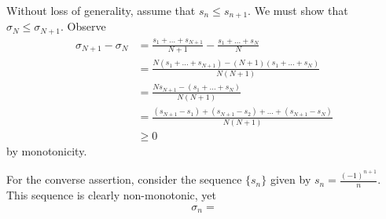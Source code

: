 \documentclass{homework}
\begin{document}

\begin{solution}
  Without loss of generality, assume that $s_n\le s_{n+1}$. We must show that $\sigma_N \le \sigma_{N+1}$.  Observe
  \begin{align*}
    \sigma_{N+1} - \sigma_N 
    &= \frac{s_1 + \dots + s_{N+1}}{N+1} - \frac{s_1 + \dots + s_N}{N} \\
    &= \frac{N(s_1+\dots + s_{N+1}) - (N+1)(s_1+\dots + s_N)}{N(N+1)}\\
    &= \frac{Ns_{N+1} - (s_1+\dots + s_N)}{N(N+1)}\\
    &= \frac{(s_{N+1} - s_1) + (s_{N+1} - s_2) + \dots + (s_{N+1} - s_N)}{N(N+1)}\\
    &\ge 0 
  \end{align*}
  by monotonicity.

  For the converse assertion, consider the sequence $\{s_n\}$ given by $s_n = \frac{(-1)^{n+1}}{n}$. This sequence is clearly non-monotonic, yet
  \begin{align*}
    \sigma_n = 
  \end{align*}
\end{solution}
\end{document}
